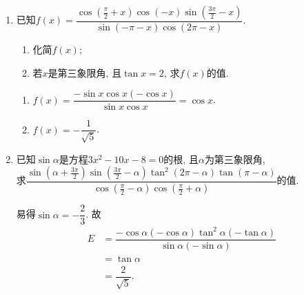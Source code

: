 \begin{enumerate}
\item 已知$f\left(x\right)=\dfrac{\cos\left(\frac{\pi}{2}+x\right)\cos\left(-x\right)\sin\left(\frac{3\pi}{2}-x\right)}{\sin\left(-\pi-x\right)\cos\left(2\pi-x\right)}$. 
\begin{enumerate}[(1)]
\item 化简$f\left(x\right)$; 
\item 若$x$是第三象限角, 且$\tan{x}=2$, 求$f\left(x\right)$的值. 
\end{enumerate}
\begin{jieda}
\begin{enumerate}[(1)]
\item $f\left(x\right)=\dfrac{-\sin{x}\cos{x}\left(-\cos{x}\right)}{\sin{x}\cos{x}}=\cos{x}$. 
\item $f\left(x\right)=-\dfrac{1}{\sqrt{5}}$. 
\end{enumerate}
\end{jieda}

\item 已知$\sin\alpha$是方程$3x^2-10x-8=0$的根, 且$\alpha$为第三象限角, \\
求$\dfrac{\sin\left(\alpha+\frac{3\pi}{2}\right)\sin\left(\frac{3\pi}{2}-\alpha\right)\tan^2\left(2\pi-\alpha\right)\tan\left(\pi-\alpha\right)}
{\cos\left(\frac{\pi}{2}-\alpha\right)\cos\left(\frac{\pi}{2}+\alpha\right)}$的值. 
\begin{jieda}
易得$\sin\alpha=-\dfrac{2}{3}$. 
故
\begin{align*}
E & = \dfrac{-\cos\alpha\left(-\cos\alpha\right)\tan^2\alpha\left(-\tan\alpha\right)}{\sin\alpha\left(-\sin\alpha\right)}\\
& = \tan\alpha\\
& = \dfrac{2}{\sqrt{5}}.
\end{align*}
\end{jieda}



\end{enumerate}
